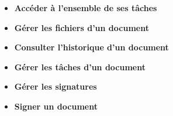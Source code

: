 \begin{itemize}
\item \textbf{Accéder à l'ensemble de ses tâches}
\item \textbf{Gérer les fichiers d'un document}
\item \textbf{Consulter l'historique d'un document}
\item \textbf{Gérer les tâches d'un document}
\item \textbf{Gérer les signatures}
\item \textbf{Signer un document}

\end{itemize}




